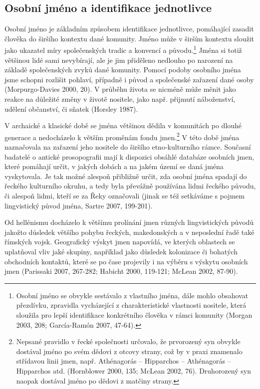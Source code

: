 
\subsection[osobní-jméno-a-identifikace-jednotlivce]{Osobní jméno a identifikace jednotlivce}

Osobní jméno je základním způsobem identifikace jednotlivce, pomáhající zasadit člověka do širšího kontextu dané komunity. Jméno může v širším kontextu sloužit jako ukazatel míry společenských tradic a konvencí a původu.\footnote{Osobní jméno se obvykle sestávalo z vlastního jména, dále mohlo obsahovat přezdívku, zpravidla vycházející z charakteristické vlastnosti nositele, která sloužila pro lepší identifikace konkrétního člověka v rámci komunity (Morgan 2003, 208; García-Ramón 2007, 47-64).} Jména si totiž většinou lidé sami nevybírají, ale je jim přiděleno nedlouho po narození na základě společenských zvyků dané komunity. Pomocí podoby osobního jména jsme schopni rozlišit pohlaví, případně i původ a společenské zařazení dané osoby (Morpurgo-Davies 2000, 20). V průběhu života se nicméně může měnit jako reakce na důležité změny v životě nositele, jako např. přijmutí náboženství, udělení občanství, či sňatek (Horsley 1987).

V archaické a klasické době se jména většinou dědila v komunitách po dlouhé generace a nedocházelo k větším proměnám fondu jmen.\footnote{Nepsané pravidlo v řecké společnosti určovalo, že prvorozený syn obvykle dostával jméno po svém dědovi z otcovy strany, což by v praxi znamenalo střídavou linii jmen, např. Athénagorás -- Hipparchos -- Athénagorás -- Hipparchos atd. (Hornblower 2000, 135; McLean 2002, 76). Druhorozený syn naopak dostával jméno po dědovi z matčiny strany.} V této době jména naznačovala na zařazení jeho nositele do širšího etno-kulturního rámce. Současní badatelé o antické prosopografii mají k dispozici obsáhlé databáze osobních jmen, které pomáhají určit, v jakých dobách a na jakém území se daná jména vyskytovala. Je tak možné alespoň přibližně určit, zda osobní jména spadají do řeckého kulturního okruhu, a tedy byla převážně používána lidmi řeckého původu, či alespoň lidmi, kteří se za Řeky označovali (jinak se též setkáváme s pojmem lingvistický původ jména, Sartre 2007, 199-201).

Od hellénismu docházelo k většímu prolínání jmen různých lingvistických původů jakožto důsledek většího pohybu řeckých, makedonských a v neposlední řadě také římských vojsk. Geografický výskyt jmen napovídá, ve kterých oblastech se uplatňoval vliv jaké skupiny, například jako důsledek kolonizace či bohatých obchodních kontaktů, které se po čase projevily i na výběru s výskytu osobních jmen (Parissaki 2007, 267-282; Habicht 2000, 119-121; McLean 2002, 87-90).

